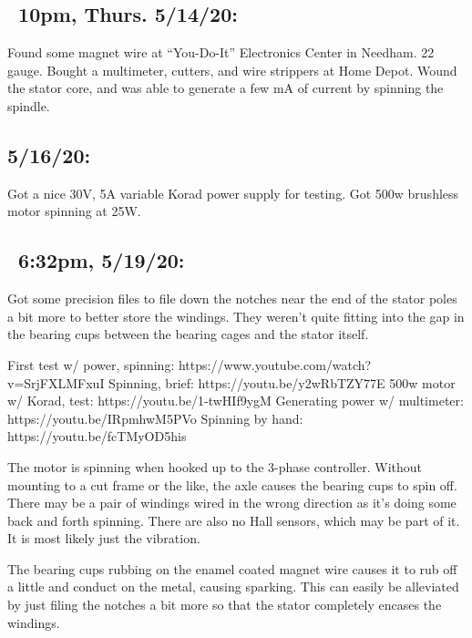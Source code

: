 \documentclass[11pt]{article} %
\begin{document}
\subsection{~10pm, Thurs. 5/14/20:} Found some magnet wire at “You-Do-It” Electronics Center in Needham. 22 gauge. Bought a multimeter, cutters, and wire strippers at Home Depot. Wound the stator core, and was able to generate a few mA of current by spinning the spindle.




\subsection{5/16/20:} Got a nice 30V, 5A variable Korad power supply for testing. Got 500w brushless motor spinning at 25W.



\subsection{~6:32pm, 5/19/20:} Got some precision files to file down the notches near the end of the stator poles a bit more to better store the windings. They weren’t quite fitting into the gap in the bearing cups between the bearing cages and the stator itself. 

First test w/ power, spinning: https://www.youtube.com/watch?v=SrjFXLMFxuI
Spinning, brief: https://youtu.be/y2wRbTZY77E
500w motor w/ Korad, test: https://youtu.be/1-twHIf9ygM
Generating power w/ multimeter: https://youtu.be/IRpmhwM5PVo
Spinning by hand: https://youtu.be/fcTMyOD5his




The motor is spinning when hooked up to the 3-phase controller. Without mounting to a cut frame or the like, the axle causes the bearing cups to spin off. There may be a pair of windings wired in the wrong direction as it’s doing some back and forth spinning. There are also no Hall sensors, which may be part of it. It is most likely just the vibration.

The bearing cups rubbing on the enamel coated magnet wire causes it to rub off a little and conduct on the metal, causing sparking. This can easily be alleviated by just filing the notches a bit more so that the stator completely encases the windings.
\end{document}
